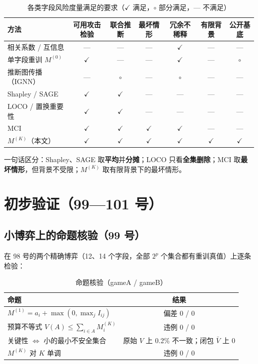 \documentclass[zihao=-4,a4paper]{ctexart}
\newcommand{\M}{M^{(K)}}
\begin{document}
\begin{table}[H]\centering
\caption{各类字段风险度量满足的要求（$\checkmark$ 满足，$\circ$ 部分满足，— 不满足）}
\footnotesize\setlength{\tabcolsep}{4pt}
\begin{tabular}{lcccccc}
\toprule
方法 & 可用攻击检验 & 联合推断 & 最坏情形 & 冗余不稀释 & 有限背景 & 公开基底 \\
\midrule
相关系数 / 互信息 & — & — & — & $\checkmark$ & — & — \\
单字段重训 $M^{(0)}$ & $\checkmark$ & — & — & $\checkmark$ & — & $\circ$ \\
推断图传播（IGNN） & — & $\circ$ & — & $\circ$ & — & — \\
Shapley / SAGE & $\checkmark$ & $\checkmark$ & — & — & — & — \\
LOCO / 置换重要性 & $\checkmark$ & $\checkmark$ & — & — & — & — \\
MCI & $\checkmark$ & $\checkmark$ & $\checkmark$ & $\checkmark$ & — & — \\
$\M$（本文） & $\checkmark$ & $\checkmark$ & $\checkmark$ & $\checkmark$ & $\checkmark$ & $\checkmark$ \\
\bottomrule
\end{tabular}
\end{table}

一句话区分：Shapley、SAGE 取\textbf{平均}并\textbf{分摊}；LOCO 只看\textbf{全集删除}；MCI 取\textbf{最坏情形}，但背景不受限；$\M$ 取有限背景下的最坏情形。

\section{初步验证（99—101 号）}

\subsection{小博弈上的命题核验（99 号）}

在 98 号的两个精确博弈（12、14 个字段，全部 $2^{p}$ 个集合都有重训真值）上逐条检验：

\begin{table}[H]\centering
\caption{命题核验（gameA / gameB）}
\begin{tabular}{lc}
\toprule
命题 & 结果 \\
\midrule
$M^{(1)}=a_i+\max(0,\max_j I_{ij})$ & 偏差 0 / 0 \\
预算不等式 $V(A)\le\sum_{i\in A}M^{(K)}_i$ & 违例 0 / 0 \\
关键性 $\Leftrightarrow$ 小的最小不安全集合 & 原始 $V$ 上 0.2\% 不一致；闭包 $\bar V$ 上 0 \\
$M^{(K)}$ 对 $K$ 单调 & 违例 0 / 0 \\
\bottomrule
\end{tabular}
\end{table}
\end{document}
